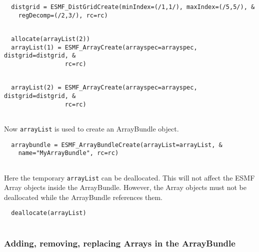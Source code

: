 
 \begin{verbatim}
  distgrid = ESMF_DistGridCreate(minIndex=(/1,1/), maxIndex=(/5,5/), &
    regDecomp=(/2,3/), rc=rc)
 
\end{verbatim}
 

 \begin{verbatim}
  allocate(arrayList(2))
  arrayList(1) = ESMF_ArrayCreate(arrayspec=arrayspec, distgrid=distgrid, &
                 rc=rc)
 
\end{verbatim}
 

 \begin{verbatim}
  arrayList(2) = ESMF_ArrayCreate(arrayspec=arrayspec, distgrid=distgrid, &
                 rc=rc)
 
\end{verbatim}
 

   Now {\tt arrayList} is used to create an ArrayBundle object. 

 \begin{verbatim}
  arraybundle = ESMF_ArrayBundleCreate(arrayList=arrayList, &
    name="MyArrayBundle", rc=rc)
 
\end{verbatim}
 

   Here the temporary {\tt arrayList} can be deallocated. This will not affect
   the ESMF Array objects inside the ArrayBundle. However, the Array objects
   must not be deallocated while the ArrayBundle references them. 

 \begin{verbatim}
  deallocate(arrayList)
 
\end{verbatim}
 

   \subsubsection{Adding, removing, replacing Arrays in the ArrayBundle}
  
